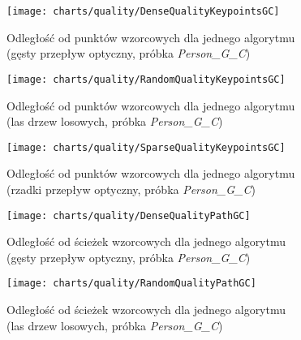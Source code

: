     \newpage
      \begin{figure}[!ht]
        \centering
        \texttt{[image: charts/quality/DenseQualityKeypointsGC]}
        \caption[Odległość od punktów wzorcowych dla jednego algorytmu (gęsty przepływ optyczny, osoba G, gest C)]
                {Odległość od punktów wzorcowych dla jednego algorytmu\\(gęsty przepływ optyczny, próbka \textit{Person\_G\_C})}
        \label{fig:DenseQualityKeypointsGC}
      \end{figure}

      \begin{figure}[!ht]
        \centering
        \texttt{[image: charts/quality/RandomQualityKeypointsGC]}
        \caption[Odległość od punktów wzorcowych dla jednego algorytmu (las drzew losowych, osoba G, gest C)]
                {Odległość od punktów wzorcowych dla jednego algorytmu\\
                 (las drzew losowych, próbka \textit{Person\_G\_C})}
        \label{fig:RandomQualityKeypointsGC}
      \end{figure}

    \newpage
      \begin{figure}[!ht]
        \centering
        \texttt{[image: charts/quality/SparseQualityKeypointsGC]}
        \caption[Odległość od punktów wzorcowych dla jednego algorytmu (rzadki przepływ optyczny, osoba G, gest C)]
                {Odległość od punktów wzorcowych dla jednego algorytmu\\(rzadki przepływ optyczny, próbka \textit{Person\_G\_C})}
        \label{fig:SparseQualityKeypointsGC}
      \end{figure}

      \begin{figure}[!ht]
        \centering
        \texttt{[image: charts/quality/DenseQualityPathGC]}
        \caption[Odległość od ścieżek wzorcowych dla jednego algorytmu  (gęsty przepływ optyczny, osoba G, gest C)]
                {Odległość od ścieżek wzorcowych dla jednego algorytmu\\(gęsty przepływ optyczny, próbka \textit{Person\_G\_C})}
        \label{fig:DenseQualityPathGC}
      \end{figure}

    \newpage
      \begin{figure}[!ht]
        \centering
        \texttt{[image: charts/quality/RandomQualityPathGC]}
        \caption[Odległość od ścieżek wzorcowych dla jednego algorytmu (las drzew losowych, osoba G, gest C)]
                {Odległość od ścieżek wzorcowych dla jednego algorytmu\\
                 (las drzew losowych, próbka \textit{Person\_G\_C})}
        \label{fig:RandomQualityPathGC}
      \end{figure}

